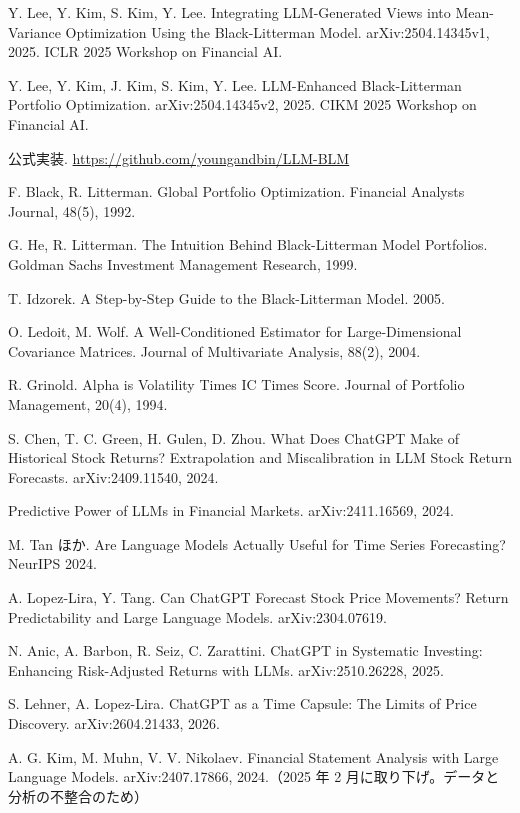 \documentclass[xelatex,ja=standard,jafont=hiragino-pron,a4paper,10pt]{bxjsreport}
\begin{document}
\begin{enumerate}[label={[\arabic*]},leftmargin=2.4em,itemsep=0.5em]
\item Y. Lee, Y. Kim, S. Kim, Y. Lee. Integrating LLM-Generated Views into Mean-Variance Optimization Using the Black-Litterman Model. arXiv:2504.14345v1, 2025. ICLR 2025 Workshop on Financial AI.
\item Y. Lee, Y. Kim, J. Kim, S. Kim, Y. Lee. LLM-Enhanced Black-Litterman Portfolio Optimization. arXiv:2504.14345v2, 2025. CIKM 2025 Workshop on Financial AI.
\item 公式実装. \url{https://github.com/youngandbin/LLM-BLM}
\item F. Black, R. Litterman. Global Portfolio Optimization. Financial Analysts Journal, 48(5), 1992.
\item G. He, R. Litterman. The Intuition Behind Black-Litterman Model Portfolios. Goldman Sachs Investment Management Research, 1999.
\item T. Idzorek. A Step-by-Step Guide to the Black-Litterman Model. 2005.
\item O. Ledoit, M. Wolf. A Well-Conditioned Estimator for Large-Dimensional Covariance Matrices. Journal of Multivariate Analysis, 88(2), 2004.
\item R. Grinold. Alpha is Volatility Times IC Times Score. Journal of Portfolio Management, 20(4), 1994.
\item S. Chen, T. C. Green, H. Gulen, D. Zhou. What Does ChatGPT Make of Historical Stock Returns? Extrapolation and Miscalibration in LLM Stock Return Forecasts. arXiv:2409.11540, 2024.
\item Predictive Power of LLMs in Financial Markets. arXiv:2411.16569, 2024.
\item M. Tan ほか. Are Language Models Actually Useful for Time Series Forecasting? NeurIPS 2024.
\item A. Lopez-Lira, Y. Tang. Can ChatGPT Forecast Stock Price Movements? Return Predictability and Large Language Models. arXiv:2304.07619.
\item N. Anic, A. Barbon, R. Seiz, C. Zarattini. ChatGPT in Systematic Investing: Enhancing Risk-Adjusted Returns with LLMs. arXiv:2510.26228, 2025.
\item S. Lehner, A. Lopez-Lira. ChatGPT as a Time Capsule: The Limits of Price Discovery. arXiv:2604.21433, 2026.
\item A. G. Kim, M. Muhn, V. V. Nikolaev. Financial Statement Analysis with Large Language Models. arXiv:2407.17866, 2024.（2025 年 2 月に取り下げ。データと分析の不整合のため）

\end{enumerate}
\end{document}
